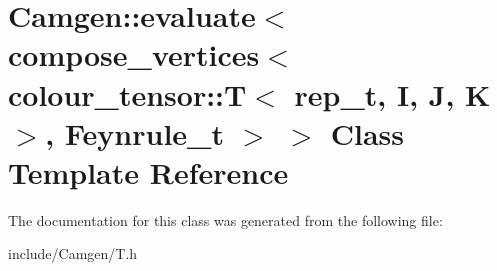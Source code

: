 \hypertarget{a00174}{}\section{Camgen\+:\+:evaluate$<$ compose\+\_\+vertices$<$ colour\+\_\+tensor\+:\+:T$<$ rep\+\_\+t, I, J, K $>$, Feynrule\+\_\+t $>$ $>$ Class Template Reference}
\label{a00174}


The documentation for this class was generated from the following file\+:\begin{DoxyCompactItemize}
\item 
include/\+Camgen/T.\+h\end{DoxyCompactItemize}
